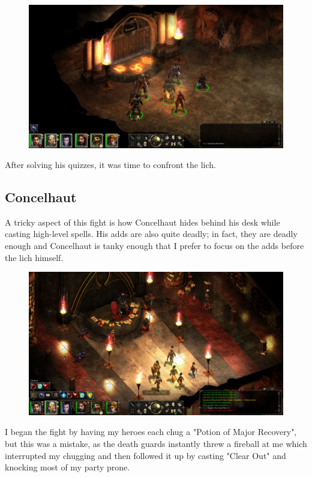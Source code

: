 \documentclass{article}
\begin{document}
\begin{figure}
\includegraphics[scale=0.33]{files/blog/2019_08_17_poe_potd_wmpt1/2019_08_17_cragholdt_bluffs_4.jpg}
\end{figure}

After solving his quizzes, it was time to confront the lich.

\subsection{Concelhaut}
A tricky aspect of this fight is how Concelhaut hides behind his desk while casting high-level spells.  His adds are also quite deadly; in fact, they are deadly enough and Concelhaut is tanky enough that I prefer to focus on the adds before the lich himself.

\begin{figure}
\includegraphics[scale=0.33]{files/blog/2019_08_17_poe_potd_wmpt1/2019_08_17_concelhaut_1.jpg}
\end{figure}

I began the fight by having my heroes each chug a "Potion of Major Recovery", but this was a mistake, as the death guards instantly threw a fireball at me which interrupted my chugging and then followed it up by casting "Clear Out" and knocking most of my party prone.
\end{document}
